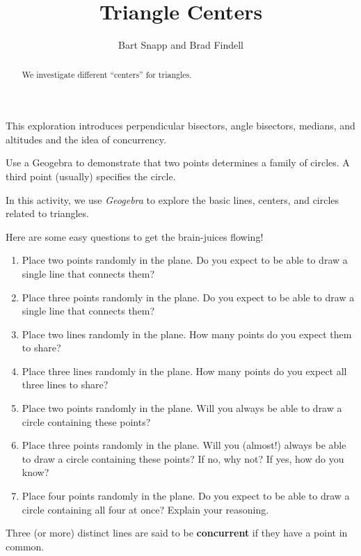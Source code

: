 \documentclass[nooutcomes]{ximera}
\title{Triangle Centers}
\author{Bart Snapp and Brad Findell}
\begin{document}
\begin{abstract}
  We investigate different ``centers'' for triangles.
\end{abstract}
\maketitle

\begin{teachingnote}
This exploration introduces perpendicular bisectors, angle bisectors, medians, and altitudes and the idea of concurrency.  

Use a Geogebra to demonstrate that two points determines a family of circles.  A third point (usually) specifies the circle.
\end{teachingnote}

In this activity, we use \textsl{Geogebra} to explore the basic lines, centers, and circles related to triangles.  

\begin{problem} Here are some easy questions to get the brain-juices flowing!
\begin{enumerate} 
\item Place two points randomly in the plane. Do you expect to be able to
draw a single line that connects them?
\item Place three points randomly in the plane. Do you expect to be able to
draw a single line that connects them?
\item Place two lines randomly in the plane. How many points do you expect
them to share?
\item Place three lines randomly in the plane. How many points do you expect
all three lines to share?
\item Place two points randomly in the plane. Will you always be
able to draw a circle containing these points?
\item Place three points randomly in the plane. Will you (almost!) always be
able to draw a circle containing these points? If no, why not? If yes,
how do you know?
\item Place four points randomly in the plane. Do you expect to be able to
draw a circle containing all four at once? Explain your reasoning.
\end{enumerate}
\end{problem}

\begin{definition}
Three (or more) distinct lines are said to be \textbf{concurrent} if they have a point in common.  
\end{definition}
\end{document}
